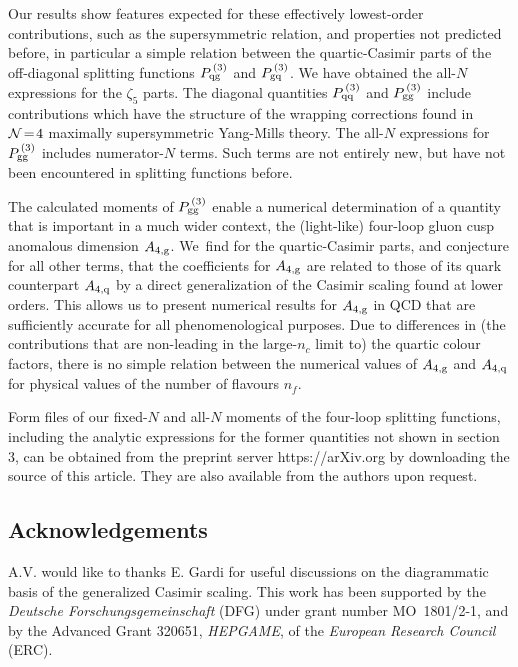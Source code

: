 \documentclass[12pt]{article}
\def\nf{{n^{}_{\! f}}}
\begin{document}
Our results show features expected for these effectively lowest-order 
contributions, such as the supersymmetric relation, and properties not 
predicted before, in particular a simple relation between the quartic-Casimir
parts of the off-diagonal splitting functions $P_{\rm qg}^{\,(3)}$ and 
$P_{\rm gq}^{\,(3)}$.
We have obtained the all-$N$ expressions for the $\zeta_5$ parts.
The diagonal quantities $P_{\rm qq}^{\,(3)}$ and $P_{\rm gg}^{\,(3)}$ include
contributions which have the structure of the wrapping corrections found in 
${\cal N} \!=\! 4$ maximally supersymmetric Yang-Mills theory.
The all-$N$ expressions for $P_{\rm gg}^{\,(3)}$ includes numerator-$N$ terms.
Such terms are not entirely new, but have not been encountered in splitting 
functions before.

The calculated moments of $P_{\rm gg}^{\,(3)}$ enable a numerical
determination of a quantity that is important in a much wider context, the 
(light-like) four-loop gluon cusp anomalous dimension $A_{4,\rm g}$.
We~find for the quartic-Casimir parts, and conjecture for all other terms,
that the coefficients for $A_{4,\rm g}$ are related to those of its quark
counterpart $A_{4,\rm q}$ by a direct generalization of the Casimir scaling 
found at lower orders. 
This allows us to present numerical results for $A_{4,\rm g}$ in QCD that 
are sufficiently accurate for all phenomenological purposes.
Due to differences in (the contributions that are non-leading in the
large-$n_c$ limit to) the quartic colour factors, there is no simple
relation between the numerical values of $A_{4,\rm g}$ and $A_{4,\rm q}$ 
for physical values of the number of flavours $\nf$.

{\sc Form} files of our fixed-$N$ and all-$N$ moments of the four-loop
splitting functions, including the analytic expressions for the former 
quantities not shown in section 3, can be obtained from the preprint server 
https://arXiv.org by downloading the source of this article.
They are also available from the authors upon request.

%
\subsection*{Acknowledgements}
\vspace*{-1mm}
A.V. would like to thanks E. Gardi for useful discussions on the diagrammatic
basis of the generalized Casimir scaling.
This work has been supported by the {\it Deutsche Forschungsgemeinschaft} 
(DFG) under grant number MO~1801/2-1, and by the Advanced Grant 320651,
{\it HEPGAME}, of the {\it European Research Council}$\,$ (ERC). 
\end{document}
